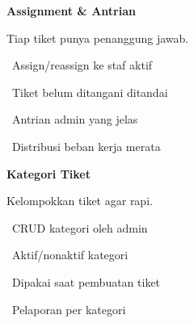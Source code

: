 \documentclass[a4paper]{article}
\begin{document}
\vspace{8pt}

\noindent
\begin{minipage}[t]{0.485\textwidth}
    \colorbox{PurplePrimary}{%
        \begin{minipage}{\dimexpr\textwidth-2\fboxsep\relax}
            {\fontsize{10}{13}\selectfont\bfseries\color{White} Assignment \& Antrian}
        \end{minipage}}\par
    \vspace{4pt}
    {\fontsize{9}{12}\selectfont\color{TextDark}%
    Tiap tiket punya penanggung jawab.\par\vspace{3pt}
    \textbullet\ Assign/reassign ke staf aktif\par\vspace{2pt}%
    \textbullet\ Tiket belum ditangani ditandai\par\vspace{2pt}%
    \textbullet\ Antrian admin yang jelas\par\vspace{2pt}%
    \textbullet\ Distribusi beban kerja merata}%

\end{minipage}%
\hfill
\begin{minipage}[t]{0.485\textwidth}
    \colorbox{BlueDark}{%
        \begin{minipage}{\dimexpr\textwidth-2\fboxsep\relax}
            {\fontsize{10}{13}\selectfont\bfseries\color{White} Kategori Tiket}
        \end{minipage}}\par
    \vspace{4pt}
    {\fontsize{9}{12}\selectfont\color{TextDark}%
    Kelompokkan tiket agar rapi.\par\vspace{3pt}
    \textbullet\ CRUD kategori oleh admin\par\vspace{2pt}%
    \textbullet\ Aktif/nonaktif kategori\par\vspace{2pt}%
    \textbullet\ Dipakai saat pembuatan tiket\par\vspace{2pt}%
    \textbullet\ Pelaporan per kategori}%

\end{minipage}

\vspace{8pt}
\end{document}

